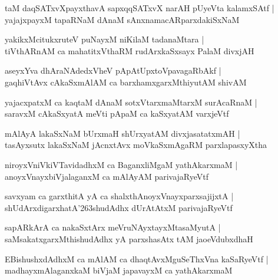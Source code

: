 \documentclass[twoside,12pt,openright]{book}
\def\S{\char'263}
\newcounter{shloka}[chapter]
\begin{document}
\begin{shloka}%
taM daqSATxvXpayxthavA sapxqqSATxvX narAH pUyeVta kalamxSAtf |\\
yajajxpayxM tapaRNaM dAnaM sAnxnamacARparxdakiSxNaM 
\end{shloka}

\begin{shloka}%
yakikxMcitukxruteV puNayxM niKilaM tadanaMtara |\\
tiVthARnAM ca mahatitxVthaRM rudArxkaSxsayx PalaM divxjAH 
\end{shloka}

\begin{shloka}%
aseyxYva dhAraNAdedxVheV pApAtUpxtoVpavagaRbAkf |\\
gaqhiVtAvx cAkaSxmAlAM ca barxhamxgarxMthiyutAM shivAM
\end{shloka}

\begin{shloka}%
yajacxpatxM ca kaqtaM dAnaM sotxVtarxmaMtarxM surAcaRnaM |\\
saravxM cAkaSxyatA meVti pApaM ca kaSxyatAM varxjeVtf
\end{shloka}

\begin{shloka}%
mAlAyA lakaSxNaM bUrxmaH shUrxyatAM divxjasatatxmAH |\\
tasAyxsutx lakaSxNaM jAcnxtAvx moVkaSxmAgaRM parxlapasxyXtha
\end{shloka}

\begin{shloka}%
niroyxVniVkiVTavidadhxM ca BaganxliMgaM yathAkarxmaM |\\
anoyxVnayxbiVjalaganxM ca mAlAyAM parivajaRyeVtf
\end{shloka}

\begin{shloka}%
savxyam ca garxthitA yA ca shalxthAnoyxVnayxparxsajijxtA |\\
shUdArxdigarxhatA\S shudAdhx dUrAtAtxM parivajaRyeVtf
\end{shloka}

\begin{shloka}%
sapARkArA ca nakaSxtArx meVruNAyxtayxMtasaMyutA |\\
saMsakatxgarxMthishudAdhx yA parxshasAtx tAM jaoeVdubxdhaH
\end{shloka}

\begin{shloka}%
EBishushxdAdhxM ca mAlAM ca dhaqtAvxMguSeThxVna kaSaRyeVtf |\\
madhayxmAlaganxkaM biVjaM japavayxM ca yathAkarxmaM
\end{shloka}
\end{document}
